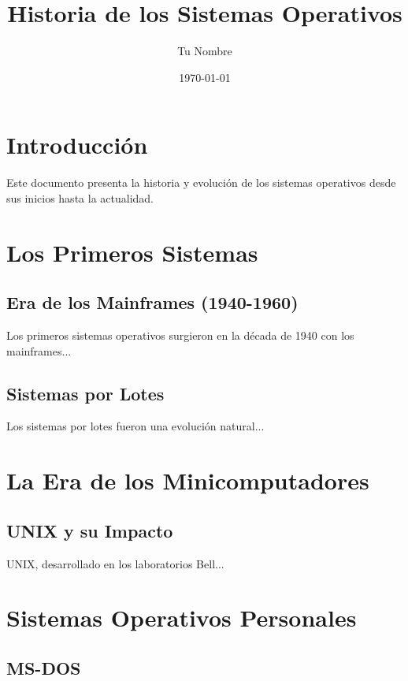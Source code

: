 \documentclass[12pt,a4paper]{article}
\title{Historia de los Sistemas Operativos}
\author{Tu Nombre}
\date{\today}
\begin{document}
\maketitle

\tableofcontents
\newpage

\section{Introducción}

Este documento presenta la historia y evolución de los sistemas operativos desde sus inicios hasta la actualidad.

\section{Los Primeros Sistemas}

\subsection{Era de los Mainframes (1940-1960)}

Los primeros sistemas operativos surgieron en la década de 1940 con los mainframes...

\subsection{Sistemas por Lotes}

Los sistemas por lotes fueron una evolución natural...

\section{La Era de los Minicomputadores}

\subsection{UNIX y su Impacto}

UNIX, desarrollado en los laboratorios Bell...

\section{Sistemas Operativos Personales}

\subsection{MS-DOS}
\end{document}
